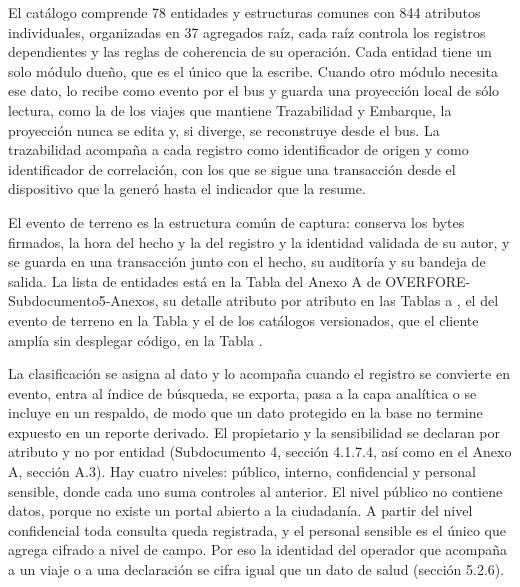 \documentclass[subdoc]{../../comun/overfore}
\begin{document}
El catálogo comprende 78 entidades y estructuras comunes con 844 atributos individuales, organizadas en 37 agregados raíz, cada raíz controla los registros dependientes y las reglas de coherencia de su operación. Cada entidad tiene un solo módulo dueño, que es el único que la escribe. Cuando otro módulo necesita ese dato, lo recibe como evento por el bus y guarda una proyección local de sólo lectura, como la de los viajes que mantiene Trazabilidad y Embarque, la proyección nunca se edita y, si diverge, se reconstruye desde el bus. La trazabilidad acompaña a cada registro como identificador de origen y como identificador de correlación, con los que se sigue una transacción desde el dispositivo que la generó hasta el indicador que la resume.

El evento de terreno es la estructura común de captura: conserva los bytes firmados, la hora del hecho y la del registro y la identidad validada de su autor, y se guarda en una transacción junto con el hecho, su auditoría y su bandeja de salida. La lista de entidades está en la Tabla  del Anexo A de OVERFORE-Subdocumento5-Anexos, su detalle atributo por atributo en las Tablas  a , el del evento de terreno en la Tabla  y el de los catálogos versionados, que el cliente amplía sin desplegar código, en la Tabla .

La clasificación se asigna al dato y lo acompaña cuando el registro se convierte en evento, entra al índice de búsqueda, se exporta, pasa a la capa analítica o se incluye en un respaldo, de modo que un dato protegido en la base no termine expuesto en un reporte derivado. El propietario y la sensibilidad se declaran por atributo y no por entidad (Subdocumento 4, sección 4.1.7.4, así como en el Anexo A, sección A.3). Hay cuatro niveles: público, interno, confidencial y personal sensible, donde cada uno suma controles al anterior. El nivel público no contiene datos, porque no existe un portal abierto a la ciudadanía. A partir del nivel confidencial toda consulta queda registrada, y el personal sensible es el único que agrega cifrado a nivel de campo. Por eso la identidad del operador que acompaña a un viaje o a una declaración se cifra igual que un dato de salud (sección 5.2.6).
\end{document}
